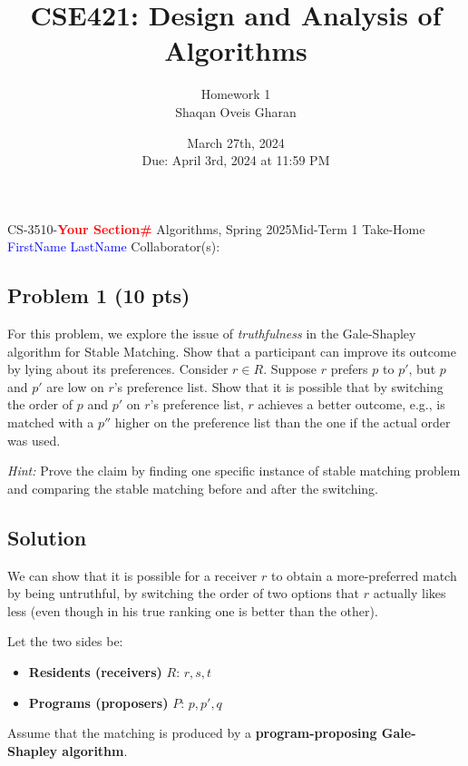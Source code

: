 \documentclass[12pt]{article}
\title{\textbf{CSE421: Design and Analysis of Algorithms}}
\author{Homework 1 \\ Shaqan Oveis Gharan}
\date{March 27th, 2024 \\ Due: April 3rd, 2024 at 11:59 PM}
\newcommand{\red}[1]{\textcolor{red}{#1}}
\newcommand{\blue}[1]{\textcolor{blue}{#1}}
\begin{document}
\noindent CS-3510-\textbf{\red{Your Section\#}} Algorithms, Spring 2025\hfill Mid-Term 1 Take-Home\\
\blue{FirstName} \blue{LastName} \hfill Collaborator(s):

\hrulefill

\subsection*{Problem 1 (10 pts)}
For this problem, we explore the issue of \textit{truthfulness} in the Gale-Shapley algorithm for Stable Matching. Show that a participant can improve its outcome by lying about its preferences. Consider $r \in R$. Suppose $r$ prefers $p$ to $p'$, but $p$ and $p'$ are low on $r$'s preference list. Show that it is possible that by switching the order of $p$ and $p'$ on $r$'s preference list, $r$ achieves a better outcome, e.g., is matched with a $p''$ higher on the preference list than the one if the actual order was used.

\textit{Hint:} Prove the claim by finding one specific instance of stable matching problem and comparing the stable matching before and after the switching.

\subsection*{Solution}

We can show that it is possible for a receiver $r$ to obtain a more-preferred match by being untruthful, by switching the order of two options that $r$ actually likes less (even though in his true ranking one is better than the other).

Let the two sides be:
\begin{itemize}
    \item \textbf{Residents (receivers)} $R$: $r, s, t$
    \item \textbf{Programs (proposers)} $P$: $p, p', q$
\end{itemize}
Assume that the matching is produced by a \textbf{program-proposing Gale-Shapley algorithm}.
\end{document}
